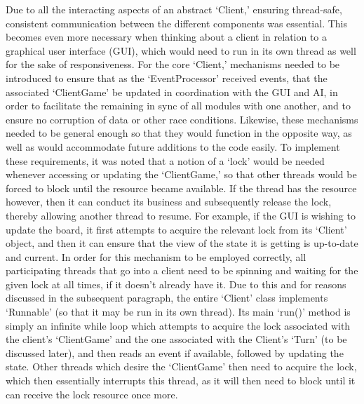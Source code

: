 \documentclass[a4paper,doc,draftfirst]{apa6}
\begin{document}
Due to all the interacting aspects of an abstract ‘Client,’ ensuring thread-safe, consistent communication between the different components was essential. This becomes even more necessary when thinking about a client in relation to a graphical user interface (GUI), which would need to run in its own thread as well for the sake of responsiveness. For the core ‘Client,’ mechanisms needed to be introduced to ensure that as the ‘EventProcessor’ received events, that the associated ‘ClientGame’ be updated in coordination with the GUI and AI, in order to facilitate the remaining in sync of all modules with one another, and to ensure no corruption of data or other race conditions. Likewise, these mechanisms needed to be general enough so that they would function in the opposite way, as well as would accommodate future additions to the code easily. To implement these requirements, it was noted that a notion of a ‘lock’ would be needed whenever accessing or updating the ‘ClientGame,’ so that other threads would be forced to block until the resource became available. If the thread has the resource however, then it can conduct its business and subsequently release the lock, thereby allowing another thread to resume. For example, if the GUI is wishing to update the board, it first attempts to acquire the relevant lock from its ‘Client’ object, and then it can ensure that the view of the state it is getting is up-to-date and current. In order for this mechanism to be employed correctly, all participating threads that go into a client need to be spinning and waiting for the given lock at all times, if it doesn’t already have it. Due to this and for reasons discussed in the subsequent paragraph, the entire ‘Client’ class implements ‘Runnable’ (so that it may be run in its own thread). Its main ‘run()’ method is simply an infinite while loop which attempts to acquire the lock associated with the client’s ‘ClientGame’ and the one associated with the Client’s ‘Turn’ (to be discussed later), and then reads an event if available, followed by updating the state. Other threads which desire the ‘ClientGame’ then need to acquire the lock, which then essentially interrupts this thread, as it will then need to block until it can receive the lock resource once more.
\end{document}
